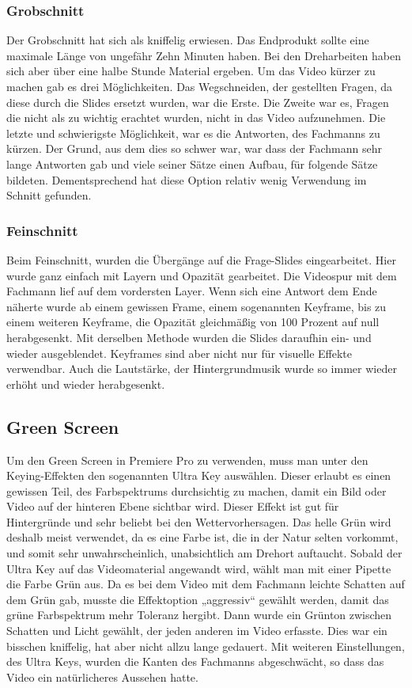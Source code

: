 \subsubsection{Grobschnitt}
Der Grobschnitt hat sich als kniffelig erwiesen. Das Endprodukt sollte eine maximale Länge von ungefähr Zehn Minuten haben. Bei den Dreharbeiten haben sich aber über eine halbe Stunde Material ergeben. Um das Video kürzer zu machen gab es drei Möglichkeiten. Das Wegschneiden, der gestellten Fragen, da diese durch die Slides ersetzt wurden, war die Erste. Die Zweite war es, Fragen die nicht als zu wichtig erachtet wurden, nicht in das Video aufzunehmen. Die letzte und schwierigste Möglichkeit, war es die Antworten, des Fachmanns zu kürzen. Der Grund, aus dem dies so schwer war, war dass der Fachmann sehr lange Antworten gab und viele seiner Sätze einen Aufbau, für folgende Sätze bildeten. Dementsprechend hat diese Option relativ wenig Verwendung im Schnitt gefunden.
\subsubsection{Feinschnitt}
Beim Feinschnitt, wurden die Übergänge auf die Frage-Slides eingearbeitet. Hier wurde ganz einfach mit Layern und Opazität gearbeitet. Die Videospur mit dem Fachmann lief auf dem vordersten Layer. Wenn sich eine Antwort dem Ende näherte wurde ab einem gewissen Frame, einem sogenannten Keyframe, bis zu einem weiteren Keyframe, die Opazität gleichmäßig von 100 Prozent auf null herabgesenkt. Mit derselben Methode wurden die Slides daraufhin ein- und wieder ausgeblendet. Keyframes sind aber nicht nur für visuelle Effekte verwendbar. Auch die Lautstärke, der Hintergrundmusik wurde so immer wieder erhöht und wieder herabgesenkt.\cite{keyframes}
\subsection{Green Screen}
Um den Green Screen in Premiere Pro zu verwenden, muss man unter den Keying-Effekten den sogenannten Ultra Key auswählen. Dieser erlaubt es einen gewissen Teil, des Farbspektrums durchsichtig zu machen, damit ein Bild oder Video auf der hinteren Ebene sichtbar wird. Dieser Effekt ist gut für Hintergründe und sehr beliebt bei den Wettervorhersagen. Das helle Grün wird deshalb meist verwendet, da es eine Farbe ist, die in der Natur selten vorkommt, und somit sehr unwahrscheinlich, unabsichtlich am Drehort auftaucht. Sobald der Ultra Key auf das Videomaterial angewandt wird, wählt man mit einer Pipette die Farbe Grün aus. Da es bei dem Video mit dem Fachmann leichte Schatten auf dem Grün gab, musste die Effektoption „aggressiv“ gewählt werden, damit das grüne Farbspektrum mehr Toleranz hergibt. Dann wurde ein Grünton zwischen Schatten und Licht gewählt, der jeden anderen im Video erfasste. Dies war ein bisschen kniffelig, hat aber nicht allzu lange gedauert. Mit weiteren Einstellungen, des Ultra Keys, wurden die Kanten des Fachmanns abgeschwächt, so dass das Video ein natürlicheres Aussehen hatte.\cite{ultra}

